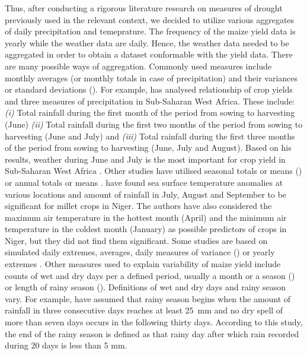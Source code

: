 \documentclass[a4paper,12pt]{article}
\begin{document}
Thus, after conducting a rigorous literature research on measures of drought previously used in the relevant context, we decided to utilize various aggregates of daily precipitation and temeprature. The frequency of the maize yield data is yearly while the weather data are daily. Hence, the weather data needed to be aggregated in order to obtain a dataset conformable with the yield data. There are many possible ways of aggregation. Commonly used measures include monthly averages (or monthly totals in case of precipitation) and their variances or standard deviations (\citealt{AbrahaSavage2006, LobellEtAl2008, ThorntonEtAl2009}). For example, \cite{Adejuwon2004} has analysed relationship of crop yields and three measures of precipitation in Sub-Saharan West Africa. These include: \textit{(i)} Total rainfall during the first month of the period from sowing to harvesting (June) \textit{(ii)} Total rainfall during the first two months of the period from sowing to harvesting (June and July) and \textit{(iii)} Total rainfall during the first three months of the period from sowing to harvesting (June, July and August). Based on his results, weather during June and July is the most important for crop yield in Sub-Saharan West Africa \citep{Adejuwon2004}. Other studies have utilised seasonal totals or means (\citealt{sagoe2006,LobellBurke2010}) or annual totals or means \citep{BLIGNAUT2009}. \cite{BenMohamed2002} have found sea surface temperature anomalies at various locations and amount of rainfall in July, August and September to be significant for millet crops in Niger. The authors have also considered the maximum air temperature in the hottest month (April) and the minimum air temperature in the coldest month (January) as possible predictors of crops in Niger, but they did not find them significant. Some studies are based on simulated daily extremes, averages, daily measures of variance  (\citealt{SchulzeEtA1993,Chipanshi2003,AbrahaSavage2006}) or yearly extremes \citep{sagoe2006}. Other measures used to explain variability of maize yield include counts of wet and dry days per a defined period, usually a month or a season (\citealt{BenMohamed2002,AbrahaSavage2006,sagoe2006,Giannakopoulos2009}) or length of rainy season (\citealt{Leemans1993,BenMohamed2002}). Definitions of wet and dry days and rainy season vary. For example, \cite{BenMohamed2002} have assumed that rainy season begins when the amount of rainfall in three consecutive days reaches at least 25~mm and no dry spell of more than seven days occurs in the following thirty days. According to this study, the end of the rainy season is defined as that rainy day after which rain recorded during 20 days is less than 5 mm.
\end{document}
